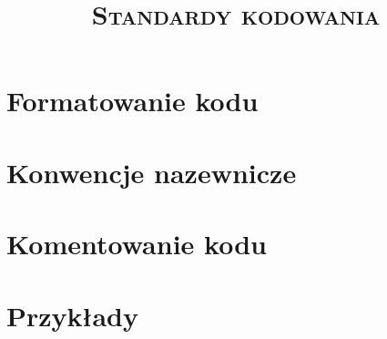 \documentclass[a4paper]{article}
\title{\textsc{Standardy kodowania}}
\begin{document}
	\maketitle
	
	\section{Formatowanie kodu}
	\section{Konwencje nazewnicze}
	\section{Komentowanie kodu}
	\section{Przykłady}
	
\end{document}
